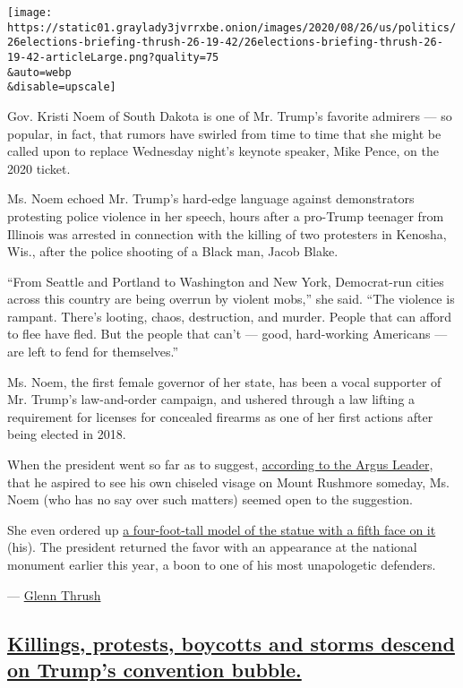 \texttt{[image: https://static01.graylady3jvrrxbe.onion/images/2020/08/26/us/politics/26elections-briefing-thrush-26-19-42/26elections-briefing-thrush-26-19-42-articleLarge.png?quality=75\\\&auto=webp\\\&disable=upscale]}

Gov. Kristi Noem of South Dakota is one of Mr. Trump's favorite admirers
--- so popular, in fact, that rumors have swirled from time to time that
she might be called upon to replace Wednesday night's keynote speaker,
Mike Pence, on the 2020 ticket.

Ms. Noem echoed Mr. Trump's hard-edge language against demonstrators
protesting police violence in her speech, hours after a pro-Trump
teenager from Illinois was arrested in connection with the killing of
two protesters in Kenosha, Wis., after the police shooting of a Black
man, Jacob Blake.

``From Seattle and Portland to Washington and New York, Democrat-run
cities across this country are being overrun by violent mobs,'' she
said. ``The violence is rampant. There's looting, chaos, destruction,
and murder. People that can afford to flee have fled. But the people
that can't --- good, hard-working Americans --- are left to fend for
themselves.''

Ms. Noem, the first female governor of her state, has been a vocal
supporter of Mr. Trump's law-and-order campaign, and ushered through a
law lifting a requirement for licenses for concealed firearms as one of
her first actions after being elected in 2018.

When the president went so far as to suggest,
\href{https://www.argusleader.com/story/news/2018/04/24/president-donald-trump-mount-rushmore-trumpmore/544597002/}{according
to the Argus Leader}, that he aspired to see his own chiseled visage on
Mount Rushmore someday, Ms. Noem (who has no say over such matters)
seemed open to the suggestion.

She even ordered up
\href{https://www.nytimes3xbfgragh.onion/2020/08/08/us/politics/kristi-noem-pence-trump.html}{a
four-foot-tall model of the statue with a fifth face on it} (his). The
president returned the favor with an appearance at the national monument
earlier this year, a boon to one of his most unapologetic defenders.

--- \href{https://www.nytimes3xbfgragh.onion/by/glenn-thrush}{Glenn
Thrush}

\hypertarget{killings-protests-boycotts-and-storms-descend-on-trumps-convention-bubble}{%
\subsection{\texorpdfstring{\protect\hyperlink{killings-protests-boycotts-and-storms-descend-on-trumps-convention-bubble}{Killings,
protests, boycotts and storms descend on Trump's convention
bubble.}}{Killings, protests, boycotts and storms descend on Trump's convention bubble.}}\label{killings-protests-boycotts-and-storms-descend-on-trumps-convention-bubble}}

